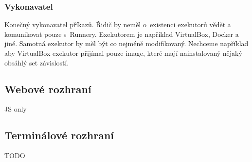 \subsubsection{Vykonavatel}

Konečný vykonavatel příkazů. Řidič by neměl o~existenci exekutorů vědět a komunikovat pouze s~Runnery.
Exekutorem je například VirtualBox, Docker a jiné.
Samotná exekutor by měl být co nejméně modifikovaný.
Nechceme například aby VirtualBox exekutor přijímal pouze image, které mají nainstalovaný nějaký obsáhlý set závislostí.

\subsection{Webové rozhraní}

JS only

\subsection{Terminálové rozhraní}

TODO


% 
% 
% 
% 
